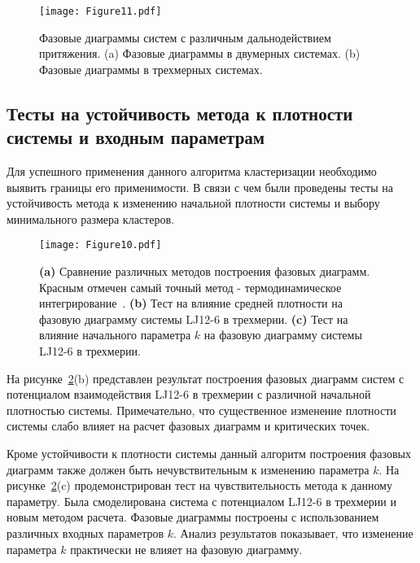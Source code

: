 \begin{figure}[!t]
    \centering
    \texttt{[image: Figure11.pdf]}
    \caption{Фазовые диаграммы систем с различным дальнодействием притяжения.
    (a) Фазовые диаграммы в двумерных системах.
    (b) Фазовые диаграммы в трехмерных системах.}
    \label{phase_diagram}
\end{figure}

\subsection{Тесты на устойчивость метода к плотности системы и входным параметрам}
\label{PRIMe-SubSecTests}


Для успешного применения данного алгоритма кластеризации необходимо выявить границы его применимости.
В связи с чем были проведены тесты на устойчивость метода к изменению начальной плотности системы и выбору минимального размера кластеров.

\begin{figure}[!t]
    \centering
    \texttt{[image: Figure10.pdf]}
    \caption{\textbf{(a)} Сравнение различных методов построения фазовых диаграмм.
    Красным отмечен самый точный метод - термодинамическое интегрирование~\cite{10.1080/00268976.2019.1699185}.
             \textbf{(b)} Тест на влияние средней плотности на фазовую диаграмму системы LJ12-6 в трехмерии.
             \textbf{(c)} Тест на влияние начального параметра $k$ на фазовую диаграмму системы LJ12-6 в трехмерии.}
    \label{tests}
\end{figure}



На рисунке~\ref{tests}(b) представлен результат построения фазовых диаграмм систем с потенциалом взаимодействия LJ12-6 в трехмерии с различной начальной плотностью системы.
Примечательно, что существенное изменение плотности системы слабо влияет на расчет фазовых диаграмм и критических точек.



Кроме устойчивости к плотности системы данный алгоритм построения фазовых диаграмм также должен быть нечувствительным к изменению параметра $k$.
На рисунке~\ref{tests}(c) продемонстрирован тест на чувствительность метода к данному параметру.
Была смоделирована система с потенциалом LJ12-6 в трехмерии и новым методом расчета.
Фазовые диаграммы построены с использованием различных входных параметров $k$.
Анализ результатов показывает, что изменение параметра $k$ практически не влияет на фазовую диаграмму.


